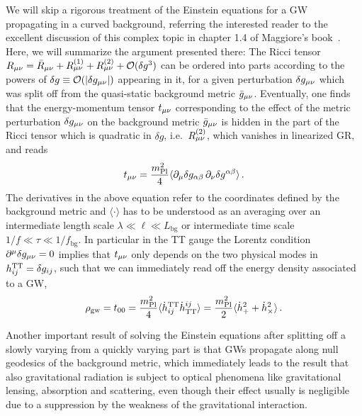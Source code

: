 We will skip a rigorous treatment of the Einstein equations for a \ac{GW} propagating in a curved background, referring the interested reader to the excellent discussion of this complex topic in chapter 1.4 of Maggiore’s book~\cite{Maggiore:2018sht}. Here, we will summarize the argument presented there: The Ricci tensor $R_{{\mu \nu}} = \bar{R}_{{\mu \nu}}  + R_{{\mu \nu}}^{(1)}  + R_{{\mu \nu}}^{(2)} + \mathcal{O}(\delta g^3)$ can be ordered into parts according to the powers of $\delta g \equiv \mathcal{O}(\lvert\delta g_{{\mu \nu}}\rvert)$ appearing in it, for a  given perturbation $\delta g_{{\mu \nu}}$ which was split off from the quasi-static background metric $\bar{g}_{{\mu \nu}}$. Eventually, one finds that the energy-momentum tensor $t_{{\mu \nu}}$ corresponding to the effect of the metric perturbation $\delta g_{{\mu \nu}}$ on the background metric $\bar{g}_{{\mu \nu}}$ is hidden in the part of the Ricci tensor which is quadratic in $\delta g$, i.e.~$ R_{{\mu \nu}}^{(2)}$, which vanishes in linearized \ac{GR}, and reads
\begin{align}
	t_{{\mu \nu}} = \frac{m_\text{Pl}^2}{4} \langle\partial_\mu \delta g_{\alpha \beta} \, \partial_\nu \delta g^{\alpha \beta} \rangle \, . \label{eq:stressenergy}
\end{align}
The derivatives in the above equation refer to the coordinates defined by the background metric and $\langle \cdot \rangle$ has to be understood as an averaging over an intermediate length scale $\lambda \ll  \ell \ll L_\text{bg}$ or intermediate time scale $1/f \ll \tau \ll 1/f_\text{bg}$. In particular in the \ac{TT} gauge the Lorentz condition $\partial^\mu \delta g_{{\mu \nu}}= 0$ implies that $t_{{\mu \nu}}$ only depends on the two physical modes in $h_{ij}^{\text{TT}} = \delta g_{ij}$, such that we can immediately read off the energy density associated to a \ac{GW},
\begin{align}
	\rho_{\text{gw}} = t_{00} = \frac{m_\text{Pl}^2}{4} \langle \dot{h}_{ij}^{\text{TT}} \dot{h}^{ij}_{\text{TT}} \rangle = \frac{m_\text{Pl}^2}{2} \langle \dot{h}_+^2 +  \dot{h}_\times^2 \rangle \, . \label{eq:rhogw}
\end{align}

Another important result of solving the Einstein equations after splitting off a slowly varying from a quickly varying part is that \acp{GW} propagate along null geodesics of the background metric, which immediately leads to the result that also gravitational radiation is subject to optical phenomena like gravitational lensing, absorption and scattering, even though their effect usually is negligible due to a suppression by the weakness of the gravitational interaction.

